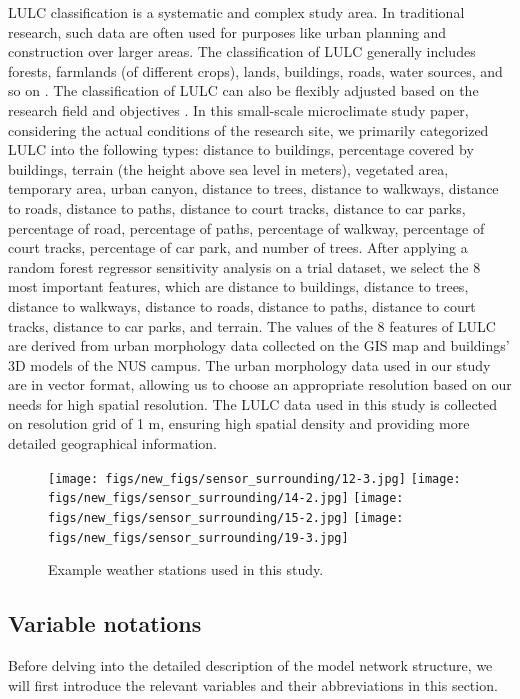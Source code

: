 \documentclass[a4paper,fleqn]{cas-sc}
\begin{document}
LULC classification is a systematic and complex study area. In traditional research, such data are often used for purposes like urban planning and construction over larger areas. The classification of LULC generally includes forests, farmlands (of different crops), lands, buildings, roads, water sources, and so on \citep{hutt2016best,vivekananda2021multi}. The classification of LULC can also be flexibly adjusted based on the research field and objectives \citep{gaur2023comprehensive}. In this small-scale microclimate study paper, considering the actual conditions of the research site, we primarily categorized LULC into the following types: distance to buildings, percentage covered by buildings, terrain (the height above sea level in meters), vegetated area, temporary area, urban canyon, distance to trees, distance to walkways, distance to roads, distance to paths, distance to court tracks, distance to car parks, percentage of road, percentage of paths, percentage of walkway, percentage of court tracks, percentage of car park, and number of trees. After applying a random forest regressor sensitivity analysis on a trial dataset, we select the 8 most important features, which are distance to buildings, distance to trees, distance to walkways, distance to roads, distance to paths, distance to court tracks, distance to car parks, and terrain. The values of the 8 features of LULC are derived from urban morphology data collected on the GIS map and buildings' 3D models of the NUS campus. The urban morphology data used in our study are in vector format, allowing us to choose an appropriate resolution based on our needs for high spatial resolution. The LULC data used in this study is collected on resolution grid of 1 m, ensuring high spatial density and providing more detailed geographical information.

\begin{figure}[!h]
	\centering
 \texttt{[image: figs/new\_figs/sensor\_surrounding/12-3.jpg]}
 \texttt{[image: figs/new\_figs/sensor\_surrounding/14-2.jpg]}
 \texttt{[image: figs/new\_figs/sensor\_surrounding/15-2.jpg]}
 \texttt{[image: figs/new\_figs/sensor\_surrounding/19-3.jpg]}
	\caption{Example weather stations used in this study.}
	\label{fig:sensor}
\end{figure}

\subsection{Variable notations
}\label{ModelSetup}
Before delving into the detailed description of the model network structure, we will first introduce the relevant variables and their abbreviations in this section.
\end{document}
